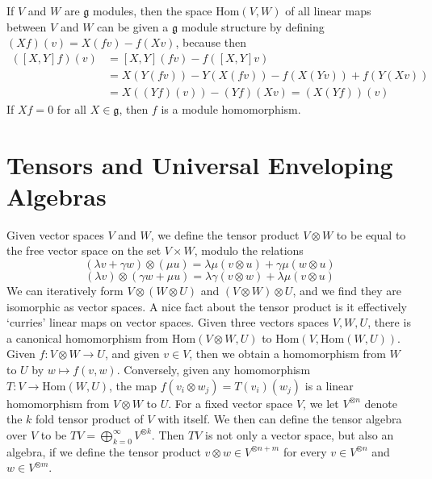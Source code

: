 If $V$ and $W$ are $\mathfrak{g}$ modules, then the space $\text{Hom}(V,W)$ of all linear maps between $V$ and $W$ can be given a $\mathfrak{g}$ module structure by defining $(Xf)(v) = X(fv) - f(Xv)$, because then
%
\begin{align*}
    ([X,Y]f)(v) &= [X,Y](fv) - f([X,Y]v)\\
    &= X(Y(fv)) - Y(X(fv)) - f(X(Yv)) + f(Y(Xv))\\
    &= X((Yf)(v)) - (Yf)(Xv) = (X(Yf))(v)
\end{align*}
%
If $Xf = 0$ for all $X \in \mathfrak{g}$, then $f$ is a module homomorphism.

\section{Tensors and Universal Enveloping Algebras}

Given vector spaces $V$ and $W$, we define the tensor product $V \otimes W$ to be equal to the free vector space on the set $V \times W$, modulo the relations
%
\[ (\lambda v + \gamma w) \otimes (\mu u) = \lambda \mu (v \otimes u) + \gamma \mu (w \otimes u) \]
%
\[ (\lambda v) \otimes (\gamma w + \mu u) = \lambda \gamma (v \otimes w) + \lambda \mu (v \otimes u) \]
%
We can iteratively form $V \otimes (W \otimes U)$ and $(V \otimes W) \otimes U$, and we find they are isomorphic as vector spaces. A nice fact about the tensor product is it effectively `curries' linear maps on vector spaces. Given three vectors spaces $V,W,U$, there is a canonical homomorphism from $\text{Hom}(V \otimes W, U)$ to $\text{Hom}(V, \text{Hom}(W,U))$. Given $f: V \otimes W \to U$, and given $v \in V$, then we obtain a homomorphism from $W$ to $U$ by $w \mapsto f(v,w)$. Conversely, given any homomorphism $T: V \to \text{Hom}(W,U)$, the map $f(v_i \otimes w_j) = T(v_i)(w_j)$ is a linear homomorphism from $V \otimes W$ to $U$. For a fixed vector space $V$, we let $V^{\otimes n}$ denote the $k$ fold tensor product of $V$ with itself. We then can define the tensor algebra over $V$ to be $TV = \bigoplus_{k = 0}^\infty V^{\otimes k}$. Then $TV$ is not only a vector space, but also an algebra, if we define the tensor product $v \otimes w \in V^{\otimes n + m}$ for every $v \in V^{\otimes n}$ and $w \in V^{\otimes m}$.

